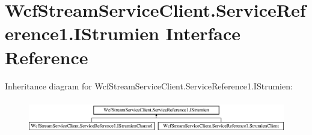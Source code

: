 \hypertarget{interface_wcf_stream_service_client_1_1_service_reference1_1_1_i_strumien}{}\section{Wcf\+Stream\+Service\+Client.\+Service\+Reference1.\+I\+Strumien Interface Reference}
\label{interface_wcf_stream_service_client_1_1_service_reference1_1_1_i_strumien}
Inheritance diagram for Wcf\+Stream\+Service\+Client.\+Service\+Reference1.\+I\+Strumien\+:\begin{figure}[H]
\begin{center}
\leavevmode
\includegraphics[height=1.497326cm]{interface_wcf_stream_service_client_1_1_service_reference1_1_1_i_strumien}
\end{center}
\end{figure}

